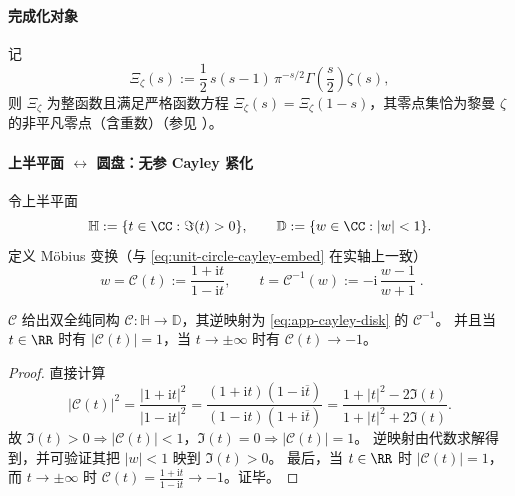 \paragraph{完成化对象}
记
\begin{equation}\label{eq:app-xi-classical}
\Xi_{\zeta}(s):=\frac12\,s(s-1)\,\pi^{-s/2}\Gamma\!\left(\frac{s}{2}\right)\zeta(s),
\end{equation}
则 \(\Xi_{\zeta}\) 为整函数且满足严格函数方程 \(\Xi_{\zeta}(s)=\Xi_{\zeta}(1-s)\)，其零点集恰为黎曼 \(\zeta\) 的非平凡零点（含重数）（参见 \cite{Apostol1976}）。

\paragraph{上半平面 \texorpdfstring{$\leftrightarrow$}{<->} 圆盘：无参 Cayley 紧化}
令上半平面
\[
\mathbb{H}:=\{t\in\CC:\Im(t)>0\},
\qquad
\mathbb{D}:=\{w\in\CC:|w|<1\}.
\]
定义 Möbius 变换（与 \eqref{eq:unit-circle-cayley-embed} 在实轴上一致）
\begin{equation}\label{eq:app-cayley-disk}
\boxed{\;
w=\mathcal{C}(t):=\frac{1+\mathrm{i}t}{1-\mathrm{i}t},
\qquad
t=\mathcal{C}^{-1}(w):=-\mathrm{i}\,\frac{w-1}{w+1}\; }.
\end{equation}

\begin{proposition}\label{prop:app-cayley-upperhalf-disk}
\(\mathcal{C}\) 给出双全纯同构 \(\mathcal{C}:\mathbb{H}\to\mathbb{D}\)，其逆映射为 \eqref{eq:app-cayley-disk} 的 \(\mathcal{C}^{-1}\)。
并且当 \(t\in\RR\) 时有 \(|\mathcal{C}(t)|=1\)，当 \(t\to\pm\infty\) 时有 \(\mathcal{C}(t)\to-1\)。
\end{proposition}
\begin{proof}
直接计算
\[
|\mathcal{C}(t)|^2
=\frac{|1+\mathrm{i}t|^2}{|1-\mathrm{i}t|^2}
=\frac{(1+\mathrm{i}t)(1-\mathrm{i}\overline t)}{(1-\mathrm{i}t)(1+\mathrm{i}\overline t)}
=\frac{1+|t|^2-2\Im(t)}{1+|t|^2+2\Im(t)}.
\]
故 \(\Im(t)>0\Rightarrow |\mathcal{C}(t)|<1\)，\(\Im(t)=0\Rightarrow |\mathcal{C}(t)|=1\)。
逆映射由代数求解得到，并可验证其把 \(|w|<1\) 映到 \(\Im(t)>0\)。
最后，当 \(t\in\RR\) 时 \(|\mathcal{C}(t)|=1\)，而 \(t\to\pm\infty\) 时 \(\mathcal{C}(t)=\frac{1+\mathrm{i}t}{1-\mathrm{i}t}\to-1\)。证毕。
\end{proof}

